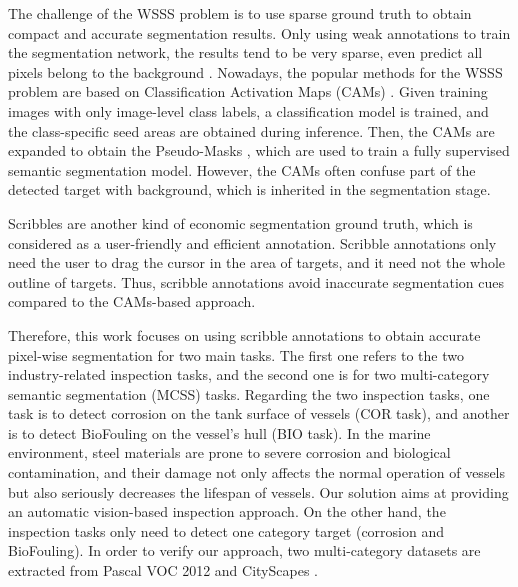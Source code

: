 \documentclass[journal]{IEEEtran}
\begin{document}
The challenge of the WSSS problem is to use sparse ground truth to obtain compact and accurate segmentation results. Only using weak annotations to train the segmentation network, the results tend to be very sparse, even predict all pixels belong to the background \cite{zhang2019survey}. Nowadays, the popular methods for the WSSS problem are based on Classification Activation Maps (CAMs) \cite{zhou2016learning}. Given training images with only image-level class labels, a classification model is trained, and the class-specific seed areas are obtained during inference. Then, the CAMs are expanded to obtain the Pseudo-Masks \cite{huang2018weakly,wei2018revisiting,wang2020self}, which are used to train a fully supervised semantic segmentation model. However, the CAMs often confuse part of the detected target with background, which is inherited in the segmentation stage.

Scribbles are another kind of economic segmentation ground truth, which is considered as a user-friendly and efficient annotation. Scribble annotations only need the user to drag the cursor in the area of targets, and it need not the whole outline of targets. Thus, scribble annotations avoid inaccurate segmentation cues compared to the CAMs-based approach. 

Therefore, this work focuses on using scribble annotations to obtain accurate pixel-wise segmentation for two main tasks. The first one refers to the two industry-related inspection tasks, and the second one is for two multi-category semantic segmentation (MCSS) tasks. Regarding the two inspection tasks, one task is to detect corrosion on the tank surface of vessels (COR task), and another is to detect BioFouling on the vessel's hull (BIO task). In the marine environment, steel materials are prone to severe corrosion and biological contamination, and their damage not only affects the normal operation of vessels but also seriously decreases the lifespan of vessels. Our solution aims at providing an automatic vision-based inspection approach. On the other hand, the inspection tasks only need to detect one category target (corrosion and BioFouling). In order to verify our approach, two multi-category datasets are extracted from Pascal VOC 2012 \cite{everingham2012pascal} and CityScapes \cite{cordts2016cityscapes}. 
\end{document}
